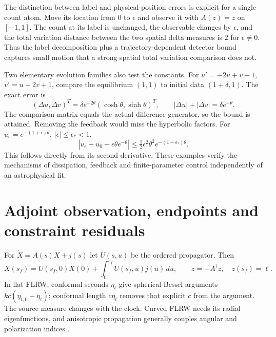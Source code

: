 The distinction between label and physical-position errors is explicit for a single count atom. Move its location from $0$ to $\epsilon$ and observe it with $A(z)=z$ on $[-1,1]$. The count at its label is unchanged, the observable changes by $\epsilon$, and the total variation distance between the two spatial delta measures is $2$ for $\epsilon\ne0$. Thus the label decomposition plus a trajectory-dependent detector bound captures small motion that a strong spatial total variation comparison does not.

Two elementary evolution families also test the constants. For
$u'=-2u+v+1$, $v'=u-2v+1$, compare the equilibrium $(1,1)$ to initial data $(1+\delta,1)$. The exact error is
\begin{equation}
 (\Delta u,\Delta v)^T
 =\delta e^{-2\theta}(\cosh\theta,\sinh\theta)^T,\qquad
 |\Delta u|+|\Delta v|=\delta e^{-\theta}.
 \label{v:feedback_saturation}
\end{equation}
The comparison matrix equals the actual difference generator, so the bound is attained. Removing the feedback would miss the hyperbolic factors. For $u_\epsilon=e^{-(1+\epsilon)\theta}$, $|\epsilon|\le\epsilon_*<1$,
\begin{equation}
 |u_\epsilon-u_0+\epsilon\theta e^{-\theta}|
 \le\tfrac12\epsilon^2\theta^2e^{-(1-\epsilon_*)\theta}.
 \label{v:scalar_taylor_check}
\end{equation}
This follows directly from its second derivative. These examples verify the mechanisms of dissipation, feedback and finite-parameter control independently of an astrophysical fit.

\section{Adjoint observation, endpoints and constraint residuals}
\label{v:observations}

For $\dot X=A(s)X+j(s)$ let $U(s,u)$ be the ordered propagator. Then
\begin{equation}
 X(s_f)=U(s_f,0)X(0)+\int_0^{s_f}U(s_f,u)j(u)\,du,\qquad
 \dot z=-A^\dagger z,\quad z(s_f)=\ell .
 \label{v:line_of_sight}
\end{equation}
In flat FLRW, conformal seconds $\eta_t$ give spherical-Bessel arguments $kc(\eta_{t,0}-\eta_t)$; conformal length $c\eta_t$ removes that explicit $c$ from the argument. The source measure changes with the clock. Curved FLRW needs its radial eigenfunctions, and anisotropic propagation generally couples angular and polarization indices \cite{vSeljak1996,vZaldarriaga1997}.


